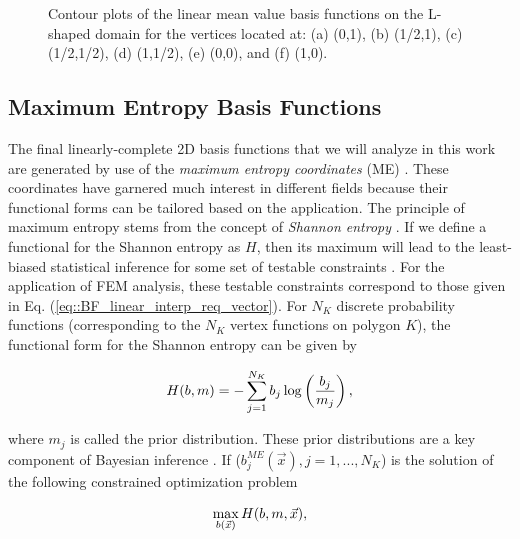\begin{figure}
\begin{subfigure}[b]{0.39\textwidth}
		\caption{}
	\end{subfigure}
\caption{Contour plots of the linear mean value basis functions on the L-shaped domain for the vertices located at: (a) (0,1), (b) (1/2,1), (c) (1/2,1/2), (d) (1,1/2), (e) (0,0), and (f) (1,0).}
\label{fig::2D_MV1_Ldom_basis_functions}
\end{figure}





\subsection{Maximum Entropy Basis Functions}
\label{sec::BF_2DLinear_ME}

The final linearly-complete 2D basis functions that we will analyze in this work are generated by use of the {\em maximum entropy coordinates} (ME) \cite{sukumar2004construction,arroyo2006local,hormann2008maximum}. These coordinates have garnered much interest in different fields because their functional forms can be tailored based on the application. The principle of maximum entropy stems from the concept of {\em Shannon entropy} \cite{shannon1948mathematical}. If we define a functional for the Shannon entropy as $H$, then its maximum will lead to the least-biased statistical inference for some set of testable constraints \cite{jaynes1957information}. For the application of FEM analysis, these testable constraints correspond to those given in Eq. (\ref{eq::BF_linear_interp_req_vector}). For $N_K$ discrete probability functions (corresponding to the $N_K$ vertex functions on polygon $K$), the functional form for the Shannon entropy can be given by

\begin{equation}
\label{eq::BF_ME_H}
H(b, m) = - \sum\displaylimits_{j=1}^{N_K} b_j \log \left(  \frac{b_j}{m_j} \right) , 
\end{equation}

\noindent where $m_j$ is called the prior distribution. These prior distributions are a key component of Bayesian inference \cite{kullback1951information,jaynes1963information}. If ($b_j^{ME} (\vec{x})  ,j=1,...,N_K$) is the solution of the following constrained optimization problem

\begin{equation}
\label{eq::BF_ME_cont_opt_probl}
\max\displaylimits_{b(\vec{x})}  H(b, m,\vec{x}),
\end{equation}

